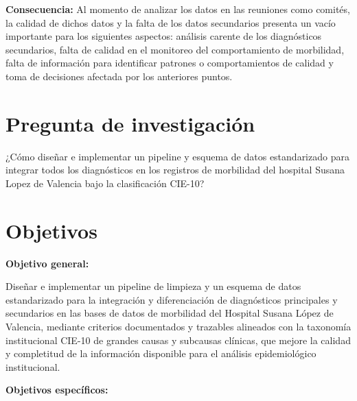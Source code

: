 \documentclass[12pt]{article}
\begin{document}
\textbf{Consecuencia:} Al momento de analizar los datos en las reuniones como comités, la calidad de dichos datos y la falta de los datos secundarios presenta un vacío importante para los siguientes aspectos: análisis carente de los diagnósticos secundarios, falta de calidad en el monitoreo del comportamiento de morbilidad, falta de información para identificar patrones o comportamientos de calidad y toma de decisiones afectada por los anteriores puntos.

\section*{Pregunta de investigación}

¿Cómo diseñar e implementar un pipeline y esquema de datos estandarizado para integrar todos los diagnósticos en los registros de morbilidad del hospital Susana Lopez de Valencia bajo la clasificación CIE-10?

\section*{Objetivos}

\textbf{Objetivo general:}

Diseñar e implementar un pipeline de limpieza y un esquema de datos estandarizado para la integración y diferenciación de diagnósticos principales y secundarios en las bases de datos de morbilidad del Hospital Susana López de Valencia, mediante criterios documentados y trazables alineados con la taxonomía institucional CIE-10 de grandes causas y subcausas clínicas, que mejore la calidad y completitud de la información disponible para el análisis epidemiológico institucional.

\vspace{0.5cm}

\textbf{Objetivos específicos:}
\end{document}
